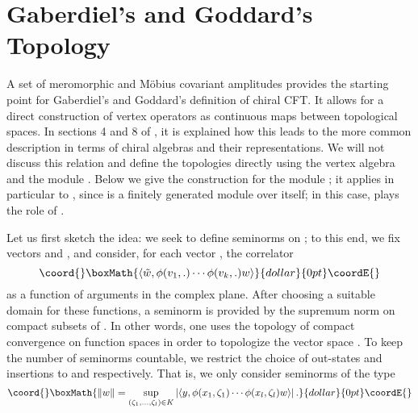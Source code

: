 \documentclass[a4paper,12pt,twoside]{article}
\renewcommand{\b}{\langle}
\renewcommand{\k}{\rangle}
\providecommand{\wt}{\tilde{w}}
\begin{document}
\section{Gaberdiel's and Goddard's Topology}
\label{Gaberdiels_and_Goddards_Topology}
A set of meromorphic and M\"{o}bius covariant amplitudes provides
the starting point for Gaberdiel's and Goddard's definition of chiral
CFT. It allows for a direct construction of vertex operators as continuous
maps between topological spaces. In sections 4 and 8 of \cite{Gaberdiel},
it is explained how this leads to the more common description
in terms of chiral algebras and their representations.
We will not discuss this relation and define the topologies
directly using the vertex algebra \coordHE{} and the module \coordHE{}.
Below we give the construction for the module \coordHE{};
it applies in particular to \coordHE{}, since \coordHE{} is a finitely generated
module over itself; in this case, \coordHE{} plays the role of \coordHE{}.

Let us first sketch the idea:
we seek to define
seminorms on \coordHE{}; to this end, we fix vectors
\myHighlight{$\wt\in W$}\coordHE{} and \coordHE{},
and consider, for each vector \coordHE{}, the correlator
$$\coord{}\boxMath{\b\wt, \phi(v_1,.)\cdots\phi(v_k,.)w\k}{dollar}{0pt}\coordE{}$$
as a function of \coordHE{} arguments in the complex plane.
After choosing a suitable domain \coordHE{} for these functions,
a seminorm is provided by the supremum norm on compact subsets \coordHE{}
of \coordHE{}. In other words, one uses the topology of compact
convergence on function spaces in order to topologize
the vector space \coordHE{}.
To keep the number of seminorms countable, we restrict
the choice of out-states and insertions to \coordHE{} and \coordHE{}
respectively. That is, we only consider
seminorms of the type
$$\coord{}\boxMath{\|w\| = \sup_{(\zeta_1,\ldots,\zeta_l)\in K} |\b y,\phi(x_1,\zeta_1)\cdots
\phi(x_l,\zeta_l)w\k|\,.}{dollar}{0pt}\coordE{}$$
\end{document}
